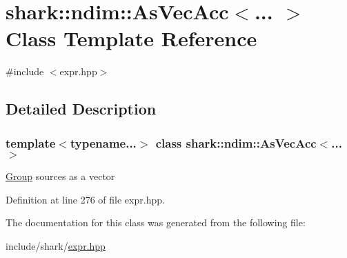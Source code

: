 \hypertarget{classshark_1_1ndim_1_1_as_vec_acc}{}\section{shark\+:\+:ndim\+:\+:As\+Vec\+Acc$<$... $>$ Class Template Reference}
\label{classshark_1_1ndim_1_1_as_vec_acc}


{\ttfamily \#include $<$expr.\+hpp$>$}



\subsection{Detailed Description}
\subsubsection*{template$<$typename...$>$\newline
class shark\+::ndim\+::\+As\+Vec\+Acc$<$... $>$}

\hyperlink{classshark_1_1_group}{Group} sources as a vector 

Definition at line 276 of file expr.\+hpp.



The documentation for this class was generated from the following file\+:\begin{DoxyCompactItemize}
\item 
include/shark/\hyperlink{expr_8hpp}{expr.\+hpp}\end{DoxyCompactItemize}
